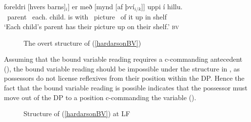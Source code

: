 \documentclass[output=paper,colorlinks,citecolor=brown,
]{langscibook}
\begin{document}
\begin{exe}
	\ex	\gll {[}foreldri [hvers barns]$_i$] er með [mynd [af því$_{i/k}$]] uppi í hillu. \label{hardarsonBV}\\
			~parent ~each.{\hardGen} child.{\hardGen} is with ~picture ~of it up in shelf\\
		\glt	`Each child's parent has their picture up on their shelf.' \hfill \textsc{bv}
\end{exe}

 

\begin{figure}
\caption{The overt structure of (\ref{hardarsonBV}) \label{hardarsonObvstr}}
\end{figure}

Assuming that the bound variable reading requires a c-commanding antecedent (\citealt{Reinhart:1983vx}), the bound variable reading should be impossible under the structure in , as possessors do not license reflexives from their position within the DP. Hence the fact that the bound variable reading is possible indicates that the possessor must move out of the DP to a position c-commanding the variable ().

\begin{figure}
\caption{Structure of (\ref{hardarsonBV}) at LF \label{hardarsonbvstr}}
\end{figure}
\end{document}
